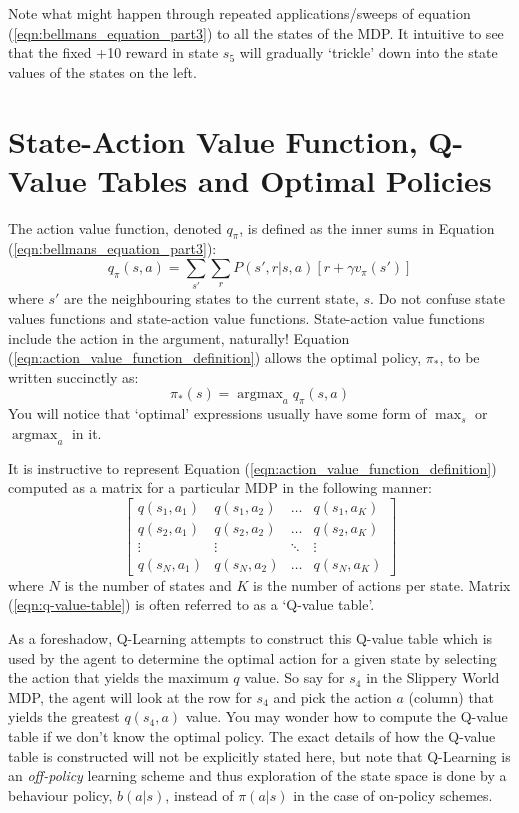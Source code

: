 \documentclass[a4paper,11pt]{article}
\DeclareMathOperator*{\argmax}{argmax}
\begin{document}
Note what might happen through repeated applications/sweeps of equation (\ref{eqn:bellmans_equation_part3}) to all the states of the MDP.  It intuitive to see that the fixed +10 reward in state $s_5$ will gradually `trickle' down into the state values of the states on the left.  



\section{State-Action Value Function, Q-Value Tables and Optimal Policies}

The action value function, denoted $q_{\pi}$, is defined as the inner sums in Equation (\ref{eqn:bellmans_equation_part3}):
\begin{equation} \label{eqn:action_value_function_definition}
    q_{\pi}(s,a) = \sum_{s'} \sum_r P(s',r|s,a) [r + \gamma v_{\pi}(s')]
\end{equation}
where $s'$ are the neighbouring states to the current state, $s$.  Do not confuse state values functions and state-action value functions.  State-action value functions include the action in the argument, naturally!  Equation (\ref{eqn:action_value_function_definition}) allows the optimal policy, $\pi_{*}$, to be written succinctly as:
\begin{equation} \label{eqn:optimal_policy_wrt_action_values}
    \pi_{*}(s) = \argmax_a q_{\pi}(s,a)
\end{equation}
You will notice that `optimal' expressions usually have some form of $\max_s$ or $\argmax_a$ in it.

It is instructive to represent Equation (\ref{eqn:action_value_function_definition}) computed as a matrix for a particular MDP in the following manner:
\begin{equation} \label{eqn:q-value-table}
\begin{bmatrix}
    q(s_1,a_1) & q(s_1,a_2) & \hdots & q(s_1,a_K) \\
    q(s_2,a_1) & q(s_2,a_2) & \hdots & q(s_2,a_K) \\
    \vdots & \vdots & \ddots & \vdots \\
    q(s_N,a_1) & q(s_N,a_2) & \hdots & q(s_N,a_K)
\end{bmatrix}
\end{equation}
where $N$ is the number of states and $K$ is the number of actions per state.  Matrix (\ref{eqn:q-value-table}) is often referred to as a `Q-value table'.  

As a foreshadow, Q-Learning attempts to construct this Q-value table which is used by the agent to determine the optimal action for a given state by selecting the action that yields the maximum $q$ value.  So say for $s_4$ in the Slippery World MDP, the agent will look at the row for $s_4$ and pick the action $a$ (column) that yields the greatest $q(s_4, a)$ value.  You may wonder how to compute the Q-value table if we don't know the optimal policy.  The exact details of how the Q-value table is constructed will not be explicitly stated here, but note that Q-Learning is an {\it off-policy} learning scheme and thus exploration of the state space is done by a behaviour policy, $b(a|s)$, instead of $\pi(a|s)$ in the case of on-policy schemes.
\end{document}

